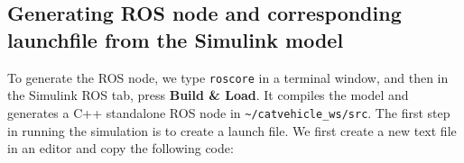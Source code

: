\documentclass[
]{article}
\newenvironment{Shaded}{\begin{snugshade}}{\end{snugshade}}
\newcommand{\ExtensionTok}[1]{#1}
\newcommand{\NormalTok}[1]{#1}
\newcommand{\OperatorTok}[1]{\textcolor[rgb]{0.81,0.36,0.00}{\textbf{#1}}}
\newcommand{\PreprocessorTok}[1]{\textcolor[rgb]{0.56,0.35,0.01}{\textit{#1}}}
\newcommand{\StringTok}[1]{\textcolor[rgb]{0.31,0.60,0.02}{#1}}
\newcommand{\VariableTok}[1]{\textcolor[rgb]{0.00,0.00,0.00}{#1}}
\begin{document}
\hypertarget{generating-ros-node-and-corresponding-launchfile-from-the-simulink-model}{%
\subsection{Generating ROS node and corresponding launchfile from the
Simulink
model}\label{generating-ros-node-and-corresponding-launchfile-from-the-simulink-model}}

To generate the ROS node, we type \texttt{roscore} in a terminal window,
and then in the Simulink ROS tab, press \textbf{Build \& Load}. It
compiles the model and generates a C++ standalone ROS node in
\texttt{\textasciitilde{}/catvehicle\_ws/src}. The first step in running
the simulation is to create a launch file. We first create a new text
file in an editor and copy the following code:

\begin{Shaded}
\end{Shaded}
\end{document}
